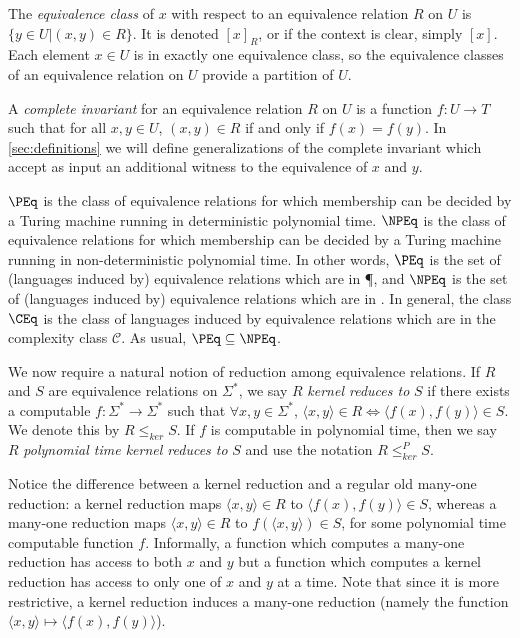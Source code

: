 \documentclass[draft]{article}
\theoremstyle{definition} \newtheorem{openproblem}[openproblem]{Open problem}
\theoremstyle{definition} \newtheorem{definition}[definition]{Definition}
\theoremstyle{remark} \newtheorem{remark}[remark]{Remark}
\newcommand{\kr}{\leq^{P}_{ker}} %
\newcommand{\krnt}{\leq_{ker}} %
\newcommand{\defn}[1]{\emph{#1}} %
\newcommand{\pair}[2]{\langle#1,#2\rangle} %
\begin{document}
The \defn{equivalence class} of $x$ with respect to an equivalence relation $R$ on $U$ is $\{y\in U|(x,y)\in R\}$. It is denoted $[x]_R$, or if the context is clear, simply $[x]$.
Each element $x\in U$ is in exactly one equivalence class, so the equivalence classes of an equivalence relation on $U$ provide a partition of $U$.

A \defn{complete invariant} for an equivalence relation $R$ on $U$ is a function $f\colon U\to T$ such that for all $x,y\in U$, $(x,y)\in R$ if and only if $f(x)=f(y)$.
In \autoref{sec:definitions} we will define generalizations of the complete invariant which accept as input an additional witness to the equivalence of $x$ and $y$.

\defn{$\PEq$} is the class of equivalence relations for which membership can be decided by a Turing machine running in deterministic polynomial time.
\defn{$\NPEq$} is the class of equivalence relations for which membership can be decided by a Turing machine running in non-deterministic polynomial time.
In other words, $\PEq$ is the set of (languages induced by) equivalence relations which are in \P, and $\NPEq$ is the set of (languages induced by) equivalence relations which are in \NP.
In general, the class \defn{$\CEq$} is the class of languages induced by equivalence relations which are in the complexity class $\mathcal{C}$.
As usual, $\PEq\subseteq\NPEq$.

We now require a natural notion of reduction among equivalence relations.
If $R$ and $S$ are equivalence relations on $\Sigma^*$, we say $R$ \defn{kernel reduces to} $S$ if there exists a computable $f\colon\Sigma^*\to\Sigma^*$ such that $\forall x,y\in\Sigma^*$, $\pair{x}{y}\in R\iff \pair{f(x)}{f(y)}\in S$.
We denote this by $R\krnt S$.
If $f$ is computable in polynomial time, then we say $R$ \defn{polynomial time kernel reduces to} $S$ and use the notation $R\kr S$.

Notice the difference between a kernel reduction and a regular old many-one reduction: a kernel reduction maps $\pair{x}{y}\in R$ to $\pair{f(x)}{f(y)}\in S$, whereas a many-one reduction maps $\pair{x}{y}\in R$ to $f(\pair{x}{y})\in S$, for some polynomial time computable function $f$.
Informally, a function which computes a many-one reduction has access to both $x$ and $y$ but a function which computes a kernel reduction has access to only one of $x$ and $y$ at a time.
Note that since it is more restrictive, a kernel reduction induces a many-one reduction (namely the function $\pair{x}{y}\mapsto\pair{f(x)}{f(y)}$).
\end{document}
